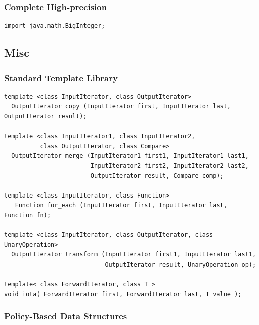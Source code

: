 \documentclass[twoside]{article}
\begin{document}
\subsubsection{Complete High-precision}
\begin{lstlisting}
import java.math.BigInteger;\end{lstlisting}
\subsection{Misc}
\subsubsection{Standard Template Library}
\begin{lstlisting}
template <class InputIterator, class OutputIterator>
  OutputIterator copy (InputIterator first, InputIterator last, OutputIterator result);

template <class InputIterator1, class InputIterator2,
          class OutputIterator, class Compare>
  OutputIterator merge (InputIterator1 first1, InputIterator1 last1,
                        InputIterator2 first2, InputIterator2 last2,
                        OutputIterator result, Compare comp);

template <class InputIterator, class Function>
   Function for_each (InputIterator first, InputIterator last, Function fn);

template <class InputIterator, class OutputIterator, class UnaryOperation>
  OutputIterator transform (InputIterator first1, InputIterator last1,
                            OutputIterator result, UnaryOperation op);

template< class ForwardIterator, class T >
void iota( ForwardIterator first, ForwardIterator last, T value );

\end{lstlisting}
\subsubsection{Policy-Based Data Structures}
\end{document}
